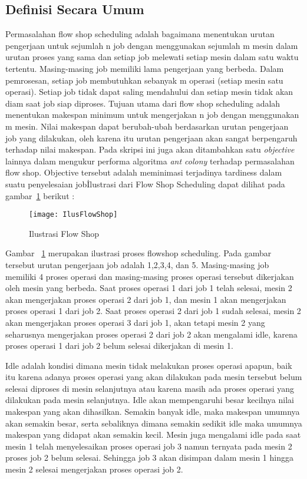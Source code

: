 \subsection{Definisi Secara Umum}
Permasalahan flow shop scheduling adalah bagaimana menentukan urutan pengerjaan untuk sejumlah
n job dengan menggunakan sejumlah m mesin dalam urutan proses yang sama dan setiap job
melewati setiap mesin dalam satu waktu tertentu. Masing-masing job memiliki lama pengerjaan
yang berbeda. Dalam pemrosesan, setiap job membutuhkan sebanyak m operasi (setiap mesin satu
operasi). Setiap job tidak dapat saling mendahului dan setiap mesin tidak akan diam saat job siap
diproses.
Tujuan utama dari flow shop scheduling adalah menentukan makespan minimum untuk mengerjakan
n job dengan menggunakan m mesin. Nilai makespan dapat berubah-ubah berdasarkan
urutan pengerjaan job yang dilakukan, oleh karena itu urutan pengerjaan akan sangat berpengaruh terhadap nilai makespan.
Pada skripsi ini juga akan ditambahkan satu {\it objective } lainnya dalam mengukur performa algoritma {\it ant colony } terhadap permasalahan 
flow shop. Objective tersebut adalah meminimasi terjadinya tardiness dalam suatu penyelesaian job\.
Ilustrasi dari Flow Shop Scheduling dapat dilihat pada gambar~\ref{fig:IlusFlowShop} berikut :
	\begin{figure}[H]
	\centering  
	\texttt{[image: IlusFlowShop]}  
	\caption[Ilustrasi Flow Shop]{Ilustrasi Flow Shop} 
	\label{fig:IlusFlowShop} 
\end{figure}

Gambar ~\ref{fig:IlusFlowShop} merupakan ilustrasi proses flowshop scheduling. Pada gambar tersebut urutan pengerjaan
job adalah 1,2,3,4, dan 5. Masing-masing job memiliki 4 proses operasi dan masing-masing
proses operasi tersebut dikerjakan oleh mesin yang berbeda. Saat proses operasi 1 dari job 1 telah
selesai, mesin 2 akan mengerjakan proses operasi 2 dari job 1, dan mesin 1 akan mengerjakan proses
operasi 1 dari job 2.
Saat proses operasi 2 dari job 1 sudah selesai, mesin 2 akan mengerjakan proses operasi 3 dari
job 1, akan tetapi mesin 2 yang seharusnya mengerjakan proses operasi 2 dari job 2 akan mengalami
idle, karena proses operasi 1 dari job 2 belum selesai dikerjakan di mesin 1. 

Idle adalah kondisi dimana mesin tidak melakukan proses operasi apapun, baik itu karena adanya proses operasi yang
akan dilakukan pada mesin tersebut belum selesai diproses di mesin selanjutnya atau karena masih
ada proses operasi yang dilakukan pada mesin selanjutnya. 
Idle akan mempengaruhi besar kecilnya nilai makespan yang akan dihasilkan. Semakin banyak idle, maka makespan umumnya
akan semakin besar, serta sebaliknya dimana semakin sedikit idle maka umumnya makespan yang
didapat akan semakin kecil.
Mesin juga mengalami idle pada saat mesin 1 telah menyelesaikan proses operasi job 3 namun
ternyata pada mesin 2 proses job 2 belum selesai. Sehingga job 3 akan disimpan dalam mesin 1
hingga mesin 2 selesai mengerjakan proses operasi job 2.

